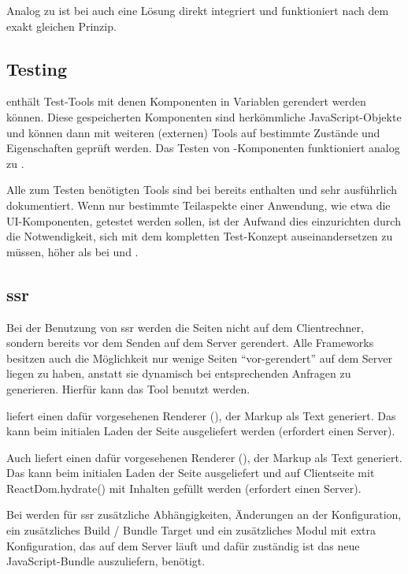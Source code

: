 Analog zu  ist bei  auch eine Lösung direkt integriert und funktioniert nach dem exakt gleichen Prinzip.

\subsection{Testing}
 enthält Test-Tools mit denen Komponenten in Variablen gerendert werden können. Diese gespeicherten Komponenten sind herkömmliche JavaScript-Objekte und können dann mit weiteren (externen) Tools auf bestimmte Zustände und Eigenschaften geprüft werden. Das Testen von -Komponenten funktioniert analog zu .

Alle zum Testen benötigten Tools sind bei  bereits enthalten und sehr ausführlich dokumentiert. Wenn nur bestimmte Teilaspekte einer Anwendung, wie etwa die UI-Komponenten, getestet werden sollen, ist der Aufwand dies einzurichten durch die Notwendigkeit, sich mit dem kompletten Test-Konzept auseinandersetzen zu müssen, höher als bei  und .

\subsection{\acrlong{ssr}}
Bei der Benutzung von \gls{ssr} werden die Seiten nicht auf dem Clientrechner, sondern bereits vor dem Senden auf dem Server gerendert. Alle Frameworks besitzen auch die Möglichkeit nur wenige Seiten ``vor-gerendert'' auf dem Server liegen zu haben, anstatt sie dynamisch bei entsprechenden Anfragen zu generieren. Hierfür kann das  Tool  benutzt werden.

 liefert einen dafür vorgesehenen Renderer (), der Markup als Text generiert. Das kann beim initialen Laden der Seite ausgeliefert werden (erfordert einen  Server).

Auch  liefert einen dafür vorgesehenen Renderer (), der Markup als Text generiert. Das kann beim initialen Laden der Seite ausgeliefert und auf Clientseite mit ReactDom.hydrate() mit Inhalten gefüllt werden (erfordert einen  Server).
    
Bei  werden für \gls{ssr} zusätzliche Abhängigkeiten, Änderungen an der Konfiguration, ein zusätzliches Build / Bundle Target und ein zusätzliches Modul mit extra Konfiguration, das auf dem Server läuft und dafür zuständig ist das neue JavaScript-Bundle auszuliefern, benötigt.

